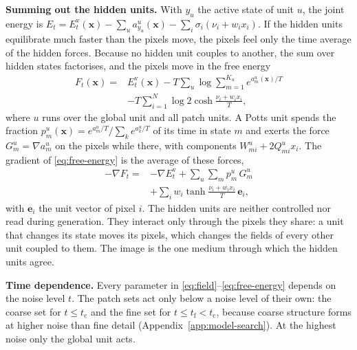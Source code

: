 \documentclass{article}
\newcommand{\x}{\bm{x}}
\newcommand{\Evis}{E^{\mathrm{v}}}
\begin{document}
\textbf{Summing out the hidden units.}
With $y_u$ the active state of unit $u$, the joint energy is
$E_t=\Evis_t(\x)-\sum_u a^{u}_{y_u}(\x)-\sum_i\sigma_i(\nu_i+w_ix_i)$.
If the hidden units equilibrate much faster than the pixels move, the pixels
feel only the time average of the hidden forces. Because no hidden unit
couples to another, the sum over hidden states factorises, and the pixels move
in the free energy
\begin{align}
  F_t(\x) ={}& \Evis_t(\x)
     - T\sum_{u}\log\sum_{m=1}^{K_u} e^{a^{u}_{m}(\x)/T} \nonumber\\
   & - T\sum_{i=1}^{N}\log 2\cosh\frac{\nu_i+w_i x_i}{T} ,
  \label{eq:free-energy}
\end{align}
where $u$ runs over the global unit and all patch units. A Potts unit spends
the fraction
$p^{u}_{m}(\x)=e^{a^{u}_{m}/T}/\sum_k e^{a^{u}_{k}/T}$
of its time in state $m$ and exerts the force
$G^{u}_{m}=\nabla a^{u}_{m}$ on the pixels while there, with components
$W^{u}_{mi}+2Q^{u}_{mi}x_i$. The gradient of \eqref{eq:free-energy} is the
average of these forces,
\begin{align}
  -\nabla F_t ={}& -\nabla\Evis_t + \sum_{u}\sum_{m}p^{u}_{m}\,G^{u}_{m}
                \nonumber\\
               & + \sum_i w_i\tanh\frac{\nu_i+w_ix_i}{T}\,\bm{e}_i ,
  \label{eq:mean-force}
\end{align}
with $\bm{e}_i$ the unit vector of pixel $i$. The hidden units are neither
controlled nor read during generation. They interact only through the pixels
they share: a unit that changes its state moves its pixels, which changes the
fields of every other unit coupled to them. The image is the one medium
through which the hidden units agree.

\textbf{Time dependence.}
Every parameter in \eqref{eq:field}--\eqref{eq:free-energy} depends on the
noise level $t$. The patch sets act only below a noise level of their own: the
coarse set for $t\le t_{\mathrm c}$ and the fine set for
$t\le t_{\mathrm f}<t_{\mathrm c}$, because coarse structure forms at higher
noise than fine detail (Appendix~\ref{app:model-search}). At the highest
noise only the global unit acts.
\end{document}
